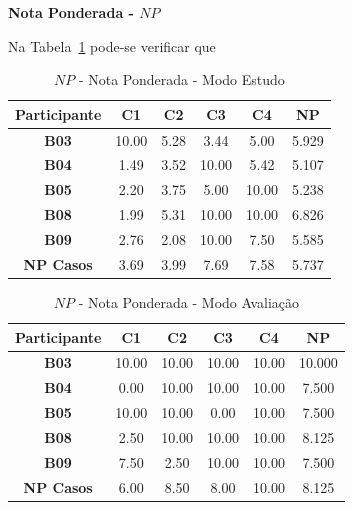 \textbf{Nota Ponderada - $NP$}

Na Tabela~\ref{tab:F3_A5_NP_ESTUDO} pode-se verificar que 

\begin{table}[htbp]
	\centering
	\caption{$NP$ - Nota Ponderada - Modo Estudo}
	\begin{tabular}{|c|c|c|c|c|c|}
		\hline
		\rowcolor[HTML]{D9D9D9} 
		\textbf{Participante} & \textbf{C1} & \textbf{C2} & \textbf{C3} & \textbf{C4} & \textbf{NP} \\ \hline
		\rowcolor[HTML]{FFFFFF} 
		\textbf{B03} & 10.00 & 5.28 & 3.44 & 5.00 & 5.929 \\ \hline
		\rowcolor[HTML]{E7E6E6} 
		\textbf{B04} & 1.49 & 3.52 & 10.00 & 5.42 & 5.107 \\ \hline
		\rowcolor[HTML]{FFFFFF} 
		\textbf{B05} & 2.20 & 3.75 & 5.00 & 10.00 & 5.238 \\ \hline
		\rowcolor[HTML]{E7E6E6} 
		\textbf{B08} & 1.99 & 5.31 & 10.00 & 10.00 & 6.826 \\ \hline
		\rowcolor[HTML]{FFFFFF} 
		\textbf{B09} & 2.76 & 2.08 & 10.00 & 7.50 & 5.585 \\ \hline
		\rowcolor[HTML]{D9D9D9} 
		\textbf{NP Casos} & 3.69 & 3.99 & 7.69 & 7.58 & 5.737 \\ \hline
	\end{tabular}
	\label{tab:F3_A5_NP_ESTUDO}
\end{table}

\begin{table}[htbp]
	\centering
	\caption{$NP$ - Nota Ponderada - Modo Avaliação}
	\begin{tabular}{|c|c|c|c|c|c|}
		\hline
		\rowcolor[HTML]{D9D9D9} 
		\textbf{Participante} & \textbf{C1} & \textbf{C2} & \textbf{C3} & \textbf{C4} & \textbf{NP} \\ \hline
		\rowcolor[HTML]{FFFFFF} 
		\textbf{B03} & 10.00 & 10.00 & 10.00 & 10.00 & 10.000 \\ \hline
		\rowcolor[HTML]{E7E6E6} 
		\textbf{B04} & 0.00 & 10.00 & 10.00 & 10.00 & 7.500 \\ \hline
		\rowcolor[HTML]{FFFFFF} 
		\textbf{B05} & 10.00 & 10.00 & 0.00 & 10.00 & 7.500 \\ \hline
		\rowcolor[HTML]{E7E6E6} 
		\textbf{B08} & 2.50 & 10.00 & 10.00 & 10.00 & 8.125 \\ \hline
		\rowcolor[HTML]{FFFFFF} 
		\textbf{B09} & 7.50 & 2.50 & 10.00 & 10.00 & 7.500 \\ \hline
		\rowcolor[HTML]{D9D9D9} 
		\textbf{NP Casos} & 6.00 & 8.50 & 8.00 & 10.00 & 8.125 \\ \hline
	\end{tabular}
	\label{tab:F3_A5_NP_AVALIACAO}
\end{table}

